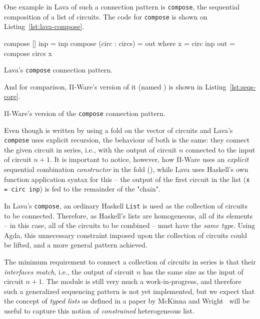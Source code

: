         One example in Lava of such a connection pattern is \texttt{compose},
        the sequential composition of a list of circuits.
        The code for \texttt{compose} is shown on Listing~\ref{lst:lava-compose}.

        \begin{listing}[h]
            \begin{haskellcode}
        compose [] inp = inp
        compose (circ : circs) = out
            where x   = circ inp
                  out = compose circs x
            \end{haskellcode}
            \caption{Lava's \texttt{compose} connection pattern.\label{lst:lava-compose}}
        \end{listing}

        And for comparison, Π-Ware's version of it (named ) is shown in Listing~\ref{lst:seqs-core}.

        \begin{listing}[h]
            \caption{Π-Ware's version of the \texttt{compose} connection pattern.\label{lst:seqs-core}}
        \end{listing}

        Even though  is written by using a fold on the vector of circuits and
        Lava's \texttt{compose} uses explicit recursion, the behaviour of both is the same:
        they connect the given circuit in series, i.e.,
        with the output of circuit $n$ connected to the input of circuit $n+1$.
        It is important to notice, however, how Π-Ware uses an \emph{explicit} sequential combination
        \emph{constructor} in the fold (), while Lava uses Haskell's own function application syntax for
        this – the output of the first circuit in the list (\texttt{x = circ inp})
        is fed to the remainder of the "chain".

        In Lava's \texttt{compose}, an ordinary Haskell \texttt{List} is used
        as the collection of circuits to be connected.
        Therefore, as Haskell's lists are homogeneous, all of its elements – in this case,
        all of the circuits to be combined – must have the \emph{same type}.
        Using Agda, this unnecessary constraint imposed upon the collection of circuits could
        be lifted, and a more general pattern achieved.

        The minimum requirement to connect a collection of circuits in series is that their \emph{interfaces match},
        i.e., the output of circuit $n$ has the same size as the input of circuit $n+1$.
        The  module is still very much a work-in-progress,
        and therefore such a generalized sequencing pattern is not yet implemented,
        but we expect that the concept of \emph{typed lists} as defined in a paper by
        McKinna and Wright~\cite{typed-stack-safe-compiler} will be useful to capture this notion of
        \emph{constrained} heterogeneous list.

